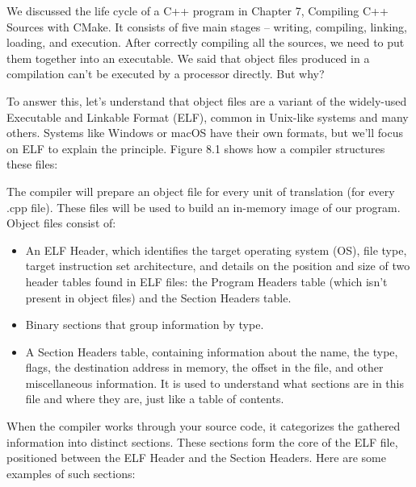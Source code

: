 We discussed the life cycle of a C++ program in Chapter 7, Compiling C++ Sources with CMake. It consists of five main stages – writing, compiling, linking, loading, and execution. After correctly compiling all the sources, we need to put them together into an executable. We said that object files produced in a compilation can’t be executed by a processor directly. But why?

To answer this, let’s understand that object files are a variant of the widely-used Executable and Linkable Format (ELF), common in Unix-like systems and many others. Systems like Windows or macOS have their own formats, but we’ll focus on ELF to explain the principle. Figure 8.1 shows how a compiler structures these files:


The compiler will prepare an object file for every unit of translation (for every .cpp file). These files will be used to build an in-memory image of our program. Object files consist of:

\begin{itemize}
\item
An ELF Header, which identifies the target operating system (OS), file type, target instruction set architecture, and details on the position and size of two header tables found in ELF files: the Program Headers table (which isn’t present in object files) and the Section Headers table.

\item
Binary sections that group information by type.

\item
A Section Headers table, containing information about the name, the type, flags, the destination address in memory, the offset in the file, and other miscellaneous information. It is used to understand what sections are in this file and where they are, just like a table of contents.
\end{itemize}

When the compiler works through your source code, it categorizes the gathered information into distinct sections. These sections form the core of the ELF file, positioned between the ELF Header and the Section Headers. Here are some examples of such sections:

